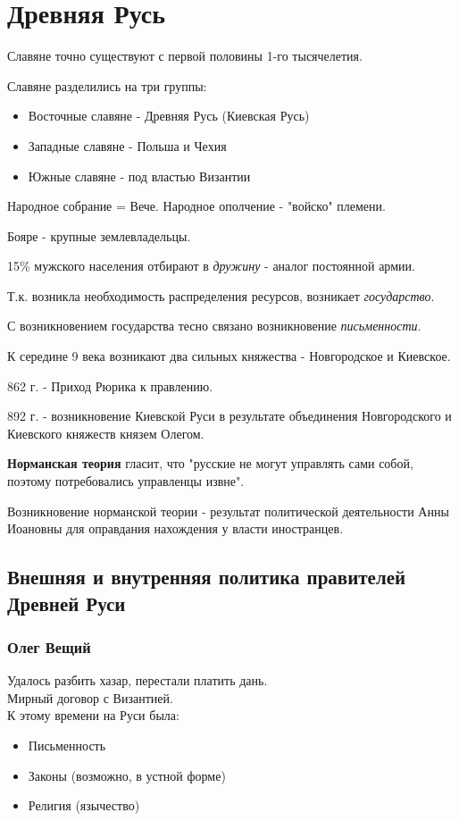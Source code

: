 \section{Древняя Русь}

Славяне точно существуют с первой половины 1-го тысячелетия.

Славяне разделились на три группы:
\begin{itemize} 
  \item Восточные славяне - Древняя Русь (Киевская Русь)
  \item Западные славяне - Польша и Чехия
  \item Южные славяне - под властью Византии
\end{itemize}

Народное собрание = Вече.
Народное ополчение - "войско" племени.

Бояре - крупные землевладельцы.

15\% мужского населения отбирают в \textit{дружину} - аналог постоянной армии.

Т.к. возникла необходимость распределения ресурсов, возникает \textit{государство}.

С возникновением государства тесно связано возникновение \textit{письменности}.

К середине 9 века возникают два сильных княжества - Новгородское и Киевское.

862 г. - Приход Рюрика к правлению.

892 г. - возникновение Киевской Руси в результате объединения Новгородского и Киевского княжеств князем Олегом.

\textbf{Норманская теория} гласит, что "русские не могут управлять сами собой, поэтому потребовались управленцы извне".

Возникновение норманской теории - результат политической деятельности Анны Иоановны для оправдания нахождения у власти иностранцев.

\subsection{Внешняя и внутренняя политика правителей Древней Руси}

\subsubsection*{Олег Вещий}

Удалось разбить хазар, перестали платить дань. \\
Мирный договор с Византией. \\
К этому времени на Руси была:
\begin{itemize}
  \item Письменность
  \item Законы (возможно, в устной форме)
  \item Религия (язычество)
\end{itemize}

